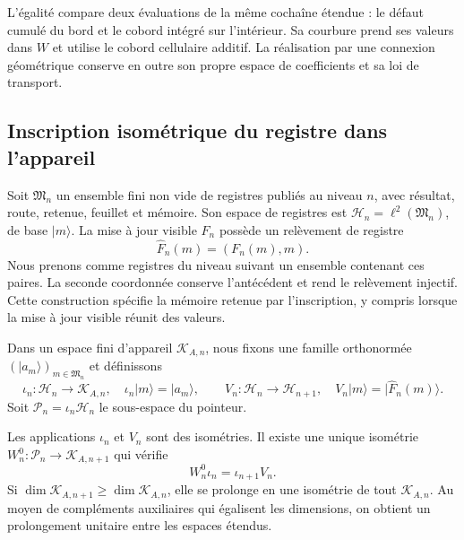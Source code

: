 L'égalité compare deux évaluations de la même cochaîne étendue : le défaut cumulé du bord et le cobord intégré sur l'intérieur. Sa courbure prend ses valeurs dans \(W\) et utilise le cobord cellulaire additif. La réalisation par une connexion géométrique conserve en outre son propre espace de coefficients et sa loi de transport.

\subsection{Inscription isométrique du registre dans l'appareil}
\label{vii:vii:sec:observador-aparato}

Soit \(\mathfrak M_n\) un ensemble fini non vide de registres
publiés au niveau \(n\), avec résultat, route, retenue, feuillet et mémoire.
Son espace de registres est
\(\mathcal H_n=\ell^2(\mathfrak M_n)\), de base \(|m\rangle\).
La mise à jour visible \(F_n\) possède un relèvement de registre
\[
 \widehat F_n(m)=(F_n(m),m).
\]
Nous prenons comme registres du niveau suivant un ensemble contenant ces paires. La seconde coordonnée conserve l'antécédent et rend le relèvement injectif. Cette construction spécifie la mémoire retenue par l'inscription, y compris lorsque la mise à jour visible réunit des valeurs.

Dans un espace fini d'appareil \(\mathcal K_{A,n}\), nous fixons une
famille orthonormée \((|a_m\rangle)_{m\in\mathfrak M_n}\) et définissons
\[
 \iota_n:\mathcal H_n\longrightarrow\mathcal K_{A,n},
 \quad \iota_n|m\rangle=|a_m\rangle,
 \qquad
 V_n:\mathcal H_n\longrightarrow\mathcal H_{n+1},
 \quad V_n|m\rangle=|\widehat F_n(m)\rangle.
\]
Soit \(\mathcal P_n=\iota_n\mathcal H_n\) le sous-espace du pointeur.

\begin{theorem}
\label{vii:vii:thm:observador-entrelazador}
Les applications \(\iota_n\) et \(V_n\) sont des isométries. Il existe une unique
isométrie \(W_n^0:\mathcal P_n\longrightarrow\mathcal K_{A,n+1}\)
qui vérifie
\begin{equation}
 W_n^0\iota_n=\iota_{n+1}V_n.
 \label{vii:vii:eq:observador-cuadrado}
\end{equation}
Si \(\dim\mathcal K_{A,n+1}\geq\dim\mathcal K_{A,n}\),
elle se prolonge en une isométrie de tout \(\mathcal K_{A,n}\).
Au moyen de compléments auxiliaires qui égalisent les dimensions, on obtient
un prolongement unitaire entre les espaces étendus.
\end{theorem}

